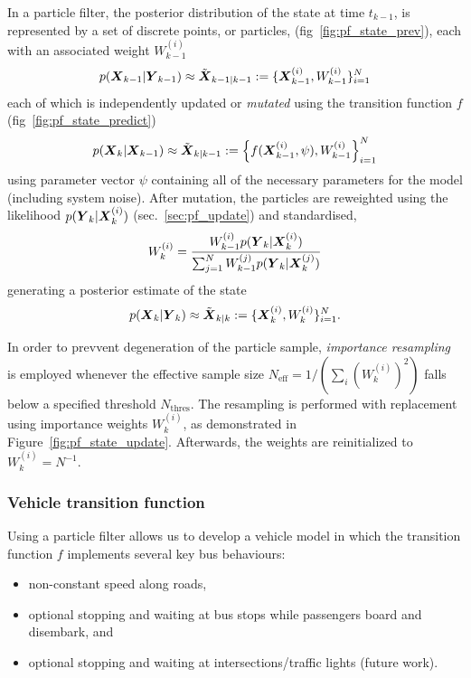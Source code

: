 In a particle filter, the posterior distribution of the state at time $t_{k-1}$,
is represented by a set of discrete points, or particles, (fig~\ref{fig:pf_state_prev}),
each with an associated weight $W_{k-1}^{(i)}$
\begin{equation}
p(\mbox{$\boldsymbol{X}$}_{k-1} | \mbox{$\boldsymbol{Y}$}_{k-1}) \approx \tilde{\mbox{$\boldsymbol{X}$}}_{k-1|k-1} 
:= \{\mbox{$\boldsymbol{X}$}_{k-1}^{(i)}, W_{k-1}^{(i)}\}_{i=1}^N
\end{equation}
each of which is independently updated or \emph{mutated} using the transition function $f$ (fig~\ref{fig:pf_state_predict})
\begin{equation}
p(\mbox{$\boldsymbol{X}$}_k | \mbox{$\boldsymbol{X}$}_{k-1}) \approx \tilde{\mbox{$\boldsymbol{X}$}}_{k|k-1} := 
\left\{f(\mbox{$\boldsymbol{X}$}_{k-1}^{(i)}, \psi), W_{k-1}^{(i)}\right\}_{i=1}^N
\end{equation}
using parameter vector $\psi$ containing all of the necessary parameters
for the model (including system noise).
After mutation, 
the particles are reweighted using the likelihood $p(\mbox{$\boldsymbol{Y}$}_k | \mbox{$\boldsymbol{X}$}_k^{(i)})$ 
(sec.~\ref{sec:pf_update}) and standardised,
\begin{equation*}
W_k^{(i)} = \frac{W_{k-1}^{(i)} p(\mbox{$\boldsymbol{Y}$}_k | \mbox{$\boldsymbol{X}$}_k^{(i)})}{
    \sum_{j=1}^N W_{k-1}^{(j)} p(\mbox{$\boldsymbol{Y}$}_k | \mbox{$\boldsymbol{X}$}_k^{(j)})
}
\end{equation*}
generating a posterior estimate of the state
\begin{equation}
p(\mbox{$\boldsymbol{X}$}_k | \mbox{$\boldsymbol{Y}$}_k) \approx \tilde{\mbox{$\boldsymbol{X}$}}_{k|k} := 
\{\mbox{$\boldsymbol{X}$}_{k}^{(i)}, W_{k}^{(i)}\}_{i=1}^N.
\end{equation}

In order to prevvent degeneration of the particle sample,
\emph{importance resampling} is employed whenever the 
effective sample size $N_{\text{eff}} = 1/(\sum_i (W_k^{(i)})^2)$
falls below a specified threshold $N_{\text{thres}}$.
The resampling is performed with replacement using importance weights $W_k^{(i)}$,
as demonstrated in Figure~\ref{fig:pf_state_update}.
Afterwards, the weights are reinitialized to $W_k^{(i)} = N^{-1}$.



\subsubsection{Vehicle transition function}
\label{sec:pf_prediction}

Using a particle filter allows us to develop a vehicle model in which
the transition function $f$ implements several key bus behaviours:
\begin{itemize}
\item non-constant speed along roads,
\item optional stopping and waiting at bus stops while passengers board and disembark, and
\item optional stopping and waiting at intersections/traffic lights (future work).
\end{itemize}


